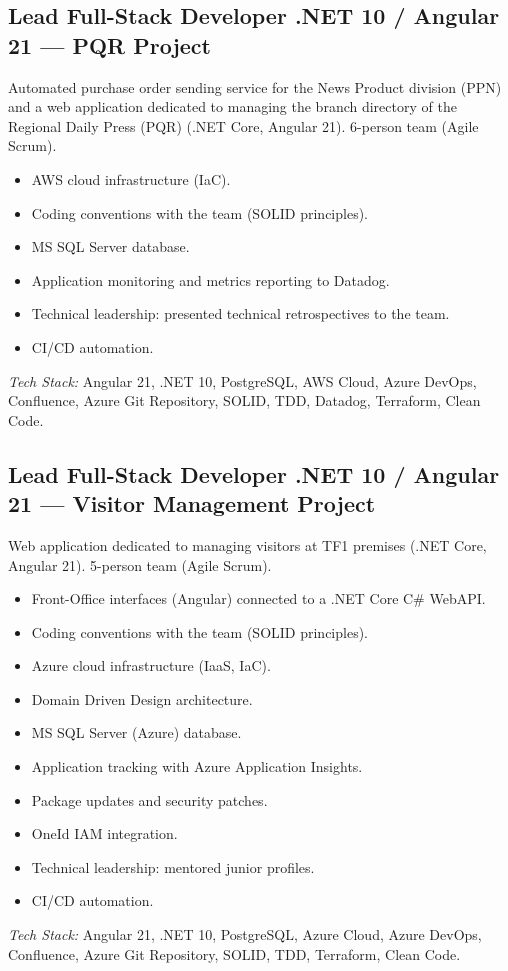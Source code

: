 \documentclass[10pt,a4paper]{article}
\begin{document}
\subsection*{Lead Full-Stack Developer .NET 10 / Angular 21 --- PQR Project}
\color{darkgray}
Automated purchase order sending service for the News Product division (PPN) and a web application dedicated to managing the branch directory of the Regional Daily Press (PQR) (.NET Core, Angular 21). 6-person team (Agile Scrum).
\begin{itemize}
  \item AWS cloud infrastructure (IaC).
  \item Coding conventions with the team (SOLID principles).
  \item MS SQL Server database.
  \item Application monitoring and metrics reporting to Datadog.
  \item Technical leadership: presented technical retrospectives to the team.
  \item CI/CD automation.
\end{itemize}
\textit{Tech Stack:} Angular 21, .NET 10, PostgreSQL, AWS Cloud, Azure DevOps, Confluence, Azure Git Repository, SOLID, TDD, Datadog, Terraform, Clean Code.

\vspace{6pt}

\subsection*{Lead Full-Stack Developer .NET 10 / Angular 21 --- Visitor Management Project}
\color{darkgray}
Web application dedicated to managing visitors at TF1 premises (.NET Core, Angular 21). 5-person team (Agile Scrum).
\begin{itemize}
  \item Front-Office interfaces (Angular) connected to a .NET Core C\# WebAPI.
  \item Coding conventions with the team (SOLID principles).
  \item Azure cloud infrastructure (IaaS, IaC).
  \item Domain Driven Design architecture.
  \item MS SQL Server (Azure) database.
  \item Application tracking with Azure Application Insights.
  \item Package updates and security patches.
  \item OneId IAM integration.
  \item Technical leadership: mentored junior profiles.
  \item CI/CD automation.
\end{itemize}
\textit{Tech Stack:} Angular 21, .NET 10, PostgreSQL, Azure Cloud, Azure DevOps, Confluence, Azure Git Repository, SOLID, TDD, Terraform, Clean Code.
\end{document}
